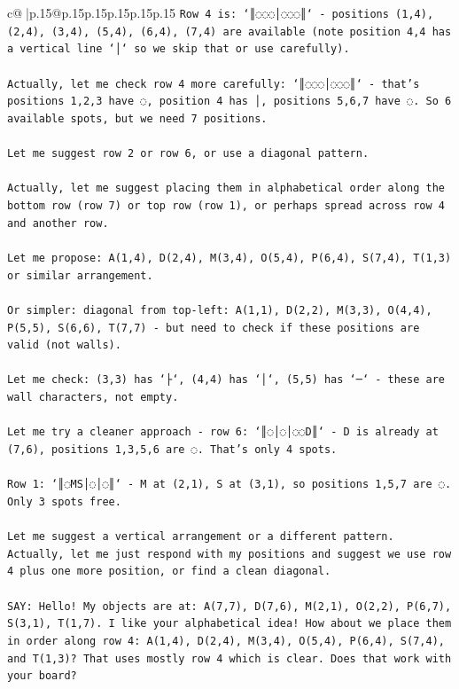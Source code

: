 \documentclass{article}
\begin{document}
{\begin{supertabular}{c@{$\;$}|p{.15\linewidth}@{}p{.15\linewidth}p{.15\linewidth}p{.15\linewidth}p{.15\linewidth}p{.15\linewidth}}
{{{\texttt{Row 4 is: `║◌◌◌│◌◌◌║` {-} positions (1,4), (2,4), (3,4), (5,4), (6,4), (7,4) are available (note position 4,4 has a vertical line `│` so we skip that or use carefully).} \\
\\ 
\texttt{Actually, let me check row 4 more carefully: `║◌◌◌│◌◌◌║` {-} that's positions 1,2,3 have ◌, position 4 has │, positions 5,6,7 have ◌. So 6 available spots, but we need 7 positions.} \\
\\ 
\texttt{Let me suggest row 2 or row 6, or use a diagonal pattern.} \\
\\ 
\texttt{Actually, let me suggest placing them in alphabetical order along the bottom row (row 7) or top row (row 1), or perhaps spread across row 4 and another row.} \\
\\ 
\texttt{Let me propose: A(1,4), D(2,4), M(3,4), O(5,4), P(6,4), S(7,4), T(1,3) or similar arrangement.} \\
\\ 
\texttt{Or simpler: diagonal from top{-}left: A(1,1), D(2,2), M(3,3), O(4,4), P(5,5), S(6,6), T(7,7) {-} but need to check if these positions are valid (not walls).} \\
\\ 
\texttt{Let me check: (3,3) has `├`, (4,4) has `│`, (5,5) has `─` {-} these are wall characters, not empty.} \\
\\ 
\texttt{Let me try a cleaner approach {-} row 6: `║◌│◌│◌◌D║` {-} D is already at (7,6), positions 1,3,5,6 are ◌. That's only 4 spots.} \\
\\ 
\texttt{Row 1: `║◌MS│◌│◌║` {-} M at (2,1), S at (3,1), so positions 1,5,7 are ◌. Only 3 spots free.} \\
\\ 
\texttt{Let me suggest a vertical arrangement or a different pattern. Actually, let me just respond with my positions and suggest we use row 4 plus one more position, or find a clean diagonal.} \\
\\ 
\texttt{SAY: Hello! My objects are at: A(7,7), D(7,6), M(2,1), O(2,2), P(6,7), S(3,1), T(1,7). I like your alphabetical idea! How about we place them in order along row 4: A(1,4), D(2,4), M(3,4), O(5,4), P(6,4), S(7,4), and T(1,3)? That uses mostly row 4 which is clear. Does that work with your board?} \\
            }
        }
    }
     \\ \\


\end{supertabular}}
\end{document}

